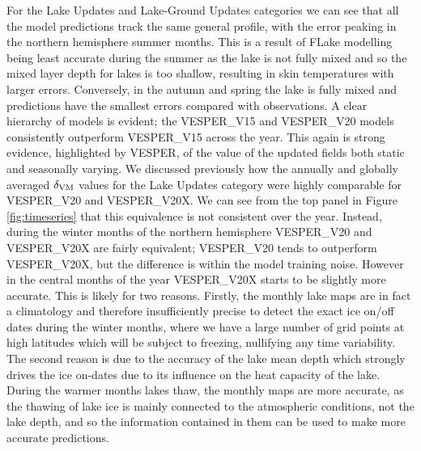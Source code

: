 \documentclass[hess, twostagejnl]{copernicus}
\begin{document}
\noindent For the Lake Updates and Lake-Ground Updates categories we can see that all the model predictions track the same general profile, with the error peaking in the northern hemisphere summer months. This is a result of FLake modelling being least accurate during the summer as the lake is not fully mixed and so the mixed layer depth for lakes is too shallow, resulting in skin temperatures with larger errors. Conversely, in the autumn and spring the lake is fully mixed and predictions have the smallest errors compared with observations. A clear hierarchy of models is evident; the VESPER\_V15 and VESPER\_V20 models consistently outperform VESPER\_V15 across the year. This again is strong evidence, highlighted by VESPER, of the value of the updated fields both static and seasonally varying. We discussed previously how the annually and globally averaged $\delta_{\rm VM}$ values for the Lake Updates category were highly comparable for VESPER\_V20 and VESPER\_V20X. We can see from the top panel in Figure \ref{fig:timeseries} that this equivalence is not consistent over the year. Instead, during the winter months of the northern hemisphere  VESPER\_V20 and VESPER\_V20X are fairly equivalent;  VESPER\_V20 tends to outperform VESPER\_V20X, but the difference is within the model training noise. However in the central months of the year VESPER\_V20X starts to be slightly more accurate. This is likely for two reasons. Firstly, the monthly lake maps are in fact a climatology and therefore insufficiently precise to detect the exact ice on/off dates during the winter months, where we have a large number of grid points at high latitudes which will be subject to freezing, nullifying any time variability. The second reason is due to the accuracy of the lake mean depth which strongly drives the ice on-dates due to its influence on the heat capacity of the lake. During the warmer months lakes thaw, the monthly maps are more accurate, as the thawing of lake ice is mainly connected to the atmospheric conditions, not the lake depth, and so the information contained in them can be used to make more accurate predictions. \newline 
\end{document}
